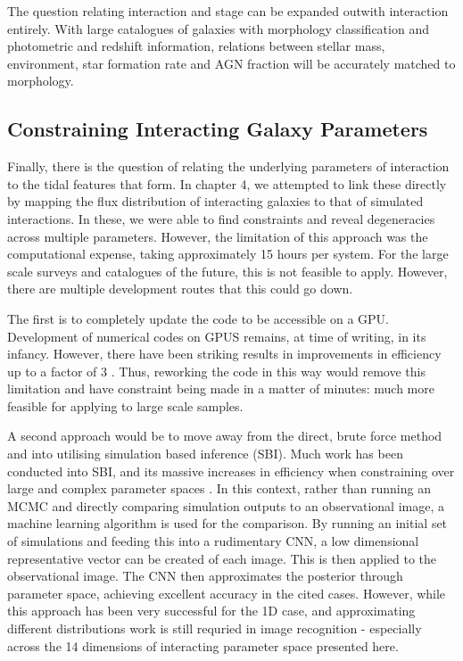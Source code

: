 The question relating interaction and stage can be expanded outwith interaction entirely. With large catalogues of galaxies with morphology classification and photometric and redshift information, relations between stellar mass, environment, star formation rate and AGN fraction will be accurately matched to morphology. 

\subsection{Constraining Interacting Galaxy Parameters}
\noindent Finally, there is the question of relating the underlying parameters of interaction to the tidal features that form. In chapter 4, we attempted to link these directly by mapping the flux distribution of interacting galaxies to that of simulated interactions. In these, we were able to find constraints and reveal degeneracies across multiple parameters. However, the limitation of this approach was the computational expense, taking approximately 15 hours per system. For the large scale surveys and catalogues of the future, this is not feasible to apply. However, there are multiple development routes that this could go down. 

The first is to completely update the code to be accessible on a GPU. Development of numerical codes on GPUS remains, at time of writing, in its infancy. However, there have been striking results in improvements in efficiency up to a factor of 3 \citep{Paper of NVIDEA numerical simulation}. Thus, reworking the code in this way would remove this limitation and have constraint being made in a matter of minutes: much more feasible for applying to large scale samples.

A second approach would be to move away from the direct, brute force method and into utilising simulation based inference (SBI). Much work has been conducted into SBI, and its massive increases in efficiency when constraining over large and complex parameter spaces \citep{Papers by Nial Jeffery}. In this context, rather than running an MCMC and directly comparing simulation outputs to an observational image, a machine learning algorithm is used for the comparison. By running an initial set of simulations and feeding this into a rudimentary CNN, a low dimensional representative vector can be created of each image. This is then applied to the observational image. The CNN then approximates the posterior through parameter space, achieving excellent accuracy in the cited cases. However, while this approach has been very successful for the 1D case, and approximating different distributions work is still requried in image recognition - especially across the 14 dimensions of interacting parameter space presented here. 

